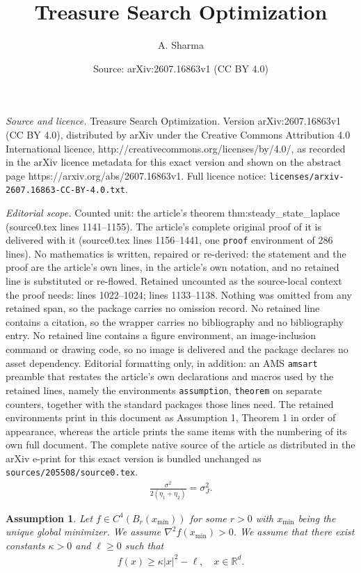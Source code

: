\documentclass[10pt,a4paper]{amsart}
\title{Treasure Search Optimization}
\author{A. Sharma}
\date{Source: arXiv:2607.16863v1 (CC BY 4.0)}
\newtheorem{assumption}{Assumption}
\begin{document}
\maketitle

\noindent\emph{Source and licence.} Treasure Search Optimization. Version arXiv:2607.16863v1 (CC BY 4.0), distributed by arXiv under the Creative Commons Attribution 4.0 International licence, http://creativecommons.org/licenses/by/4.0/, as recorded in the arXiv licence metadata for this exact version and shown on the abstract page https://arxiv.org/abs/2607.16863v1. Full licence notice: \texttt{licenses/arxiv-2607.16863-CC-BY-4.0.txt}.\par\smallskip

\noindent\textit{Editorial scope.} Counted unit: the article's theorem thm:steady\_state\_laplace (source0.tex lines 1141--1155). The article's complete original proof of it is delivered with it (source0.tex lines 1156--1441, one \texttt{proof} environment of 286 lines). No mathematics is written, repaired or re-derived: the statement and the proof are the article's own lines, in the article's own notation, and no retained line is substituted or re-flowed.  Retained uncounted as the source-local context the proof needs: lines 1022--1024; lines 1133--1138.  Nothing was omitted from any retained span, so the package carries no omission record.  No retained line contains a citation, so the wrapper carries no bibliography and no bibliography entry.  No retained line contains a figure environment, an image-inclusion command or drawing code, so no image is delivered and the package declares no asset dependency.  Editorial formatting only, in addition: an AMS \texttt{amsart} preamble that restates the article's own declarations and macros used by the retained lines, namely the environments \texttt{assumption}, \texttt{theorem} on separate counters, together with the standard packages those lines need.  The retained environments print in this document as Assumption 1, Theorem 1 in order of appearance, whereas the article prints the same items with the numbering of its own full document.  The complete native source of the article as distributed in the arXiv e-print for this exact version is bundled unchanged as \texttt{sources/205508/source0.tex}.
\begin{align}\label{tso_match_condn}
 \frac{\sigma^2}{2(\eta_1 + \eta_2)} = \sigma_J^2 .
\end{align} 

\begin{assumption}\label{tso_assum_2}
   Let $f \in C^{4}(B_r(x_{\min}))$ for some $r > 0$ with $x_{\min}$ being the unique global minimizer. We assume $\nabla^2 f(x_{\min}) > 0$. We assume that there exist constants $\kappa > 0$ and  $\ell \geq 0 $ such that 
   \begin{align}\label{tso_eqn_coerc_assum}
       f(x) \geq \kappa |x|^2 - \ell, \quad  x \in \mathbb{R}^{d}.
   \end{align}
\end{assumption}
\end{document}
